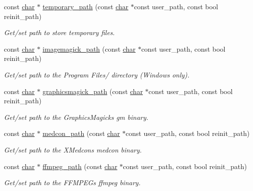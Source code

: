 \begin{DoxyCompactItemize}
const \hyperlink{classchar}{char} $\ast$ \hyperlink{namespacecimg__library__suffixed_1_1cimg_ae9af8e17db04e875db3b45cbe58892d6}{temporary\+\_\+path} (const \hyperlink{classchar}{char} $\ast$const user\+\_\+path, const bool reinit\+\_\+path)
\begin{DoxyCompactList}\small\item\em Get/set path to store temporary files. \end{DoxyCompactList}\item 
const \hyperlink{classchar}{char} $\ast$ \hyperlink{namespacecimg__library__suffixed_1_1cimg_a96cabeea0a54a10aeee97ead7b672f0f}{imagemagick\+\_\+path} (const \hyperlink{classchar}{char} $\ast$const user\+\_\+path, const bool reinit\+\_\+path)
\begin{DoxyCompactList}\small\item\em Get/set path to the {\itshape Program Files/} directory (Windows only). \end{DoxyCompactList}\item 
const \hyperlink{classchar}{char} $\ast$ \hyperlink{namespacecimg__library__suffixed_1_1cimg_ab4063d8fb2c2564596f33f4a75436f76}{graphicsmagick\+\_\+path} (const \hyperlink{classchar}{char} $\ast$const user\+\_\+path, const bool reinit\+\_\+path)
\begin{DoxyCompactList}\small\item\em Get/set path to the Graphics\+Magick\textquotesingle{}s {\ttfamily gm} binary. \end{DoxyCompactList}\item 
const \hyperlink{classchar}{char} $\ast$ \hyperlink{namespacecimg__library__suffixed_1_1cimg_a65c2f6f9671ac4f3eae2b5624313926e}{medcon\+\_\+path} (const \hyperlink{classchar}{char} $\ast$const user\+\_\+path, const bool reinit\+\_\+path)
\begin{DoxyCompactList}\small\item\em Get/set path to the X\+Medcon\textquotesingle{}s {\ttfamily medcon} binary. \end{DoxyCompactList}\item 
const \hyperlink{classchar}{char} $\ast$ \hyperlink{namespacecimg__library__suffixed_1_1cimg_a5b8fba26176c5506b1eb27e70ca44889}{ffmpeg\+\_\+path} (const \hyperlink{classchar}{char} $\ast$const user\+\_\+path, const bool reinit\+\_\+path)
\begin{DoxyCompactList}\small\item\em Get/set path to the F\+F\+M\+P\+EG\textquotesingle{}s {\ttfamily ffmpeg} binary. \end{DoxyCompactList}\item 

\end{DoxyCompactItemize}
